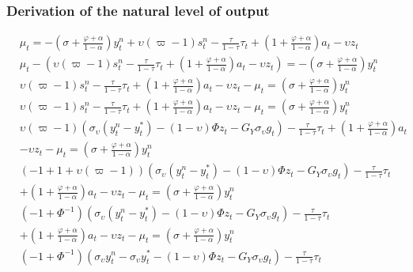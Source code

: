 \subsubsection*{Derivation of the natural level of output}
\begin{align} \label{eq:appendix_natural_level_of_output_beginning}
    &\mu_t = -\left(\sigma + \frac{\varphi + \alpha}{1-\alpha}\right)y^n_t + \upsilon (\varpi - 1) s^n_t - \frac{\tau}{1-\tau}\tau_t  + \left(1 + \frac{\varphi + \alpha}{1-\alpha}\right)a_t - \upsilon z_t\\
    &\mu_t - \left( \upsilon (\varpi - 1) s^n_t - \frac{\tau}{1-\tau}\tau_t  + \left(1 + \frac{\varphi + \alpha}{1-\alpha}\right)a_t - \upsilon z_t \right) = -\left(\sigma + \frac{\varphi + \alpha}{1-\alpha}\right)y^n_t\\
    &\upsilon (\varpi - 1) s^n_t - \frac{\tau}{1-\tau}\tau_t  + \left(1 + \frac{\varphi + \alpha}{1-\alpha}\right)a_t - \upsilon z_t -\mu_t = \left(\sigma + \frac{\varphi + \alpha}{1-\alpha}\right)y^n_t\\
    &\upsilon (\varpi - 1) s^n_t - \frac{\tau}{1-\tau}\tau_t  + \left(1 + \frac{\varphi + \alpha}{1-\alpha}\right)a_t - \upsilon z_t -\mu_t = \left(\sigma + \frac{\varphi + \alpha}{1-\alpha}\right)y^n_t\\
    &\upsilon (\varpi - 1) (\sigma_\upsilon(y^n_t - y^*_t) - (1-\upsilon)\Phi z_t - G_Y \sigma_\upsilon g_t) - \frac{\tau}{1-\tau}\tau_t  + \left(1 + \frac{\varphi + \alpha}{1-\alpha}\right)a_t \nonumber \\ 
        &- \upsilon z_t -\mu_t = \left(\sigma + \frac{\varphi + \alpha}{1-\alpha}\right)y^n_t\\
    &(- 1 + 1 + \upsilon (\varpi - 1)) (\sigma_\upsilon(y^n_t - y^*_t) - (1-\upsilon)\Phi z_t - G_Y \sigma_\upsilon g_t) - \frac{\tau}{1-\tau}\tau_t  \nonumber \\ 
        &+ \left(1 + \frac{\varphi + \alpha}{1-\alpha}\right)a_t - \upsilon z_t -\mu_t = \left(\sigma + \frac{\varphi + \alpha}{1-\alpha}\right)y^n_t\\
    &(- 1 + \Phi^{-1}) (\sigma_\upsilon(y^n_t - y^*_t) - (1-\upsilon)\Phi z_t- G_Y \sigma_\upsilon g_t) - \frac{\tau}{1-\tau}\tau_t  \nonumber \\
        &+ \left(1 + \frac{\varphi + \alpha}{1-\alpha}\right)a_t - \upsilon z_t -\mu_t = \left(\sigma + \frac{\varphi + \alpha}{1-\alpha}\right)y^n_t\\
    &(- 1 + \Phi^{-1}) (\sigma_\upsilon y^n_t - \sigma_\upsilon y^*_t - (1-\upsilon)\Phi z_t- G_Y \sigma_\upsilon g_t) - \frac{\tau}{1-\tau}\tau_t  \nonumber \\

\end{align}
